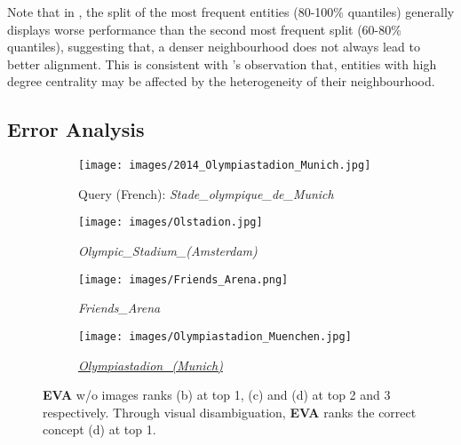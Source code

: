 \documentclass[letterpaper]{article} \usepackage{aaai21}  \usepackage{times}  \usepackage{helvet} \usepackage{courier}  \usepackage[hyphens]{url}  \usepackage{graphicx} \urlstyle{rm} \def\UrlFont{\rm}  \usepackage{natbib}  \usepackage{caption} \frenchspacing  \setlength{\pdfpagewidth}{8.5in}  \setlength{\pdfpageheight}{11in}
\newcommand{\modelname}[0]{\textbf{\textsc{EVA}}\xspace}
\begin{document}
Note that in , the split of the most frequent entities (80-100\% quantiles)
generally displays worse performance than the second most frequent split (60-80\% quantiles), suggesting that, 
a denser neighbourhood does not always lead to better alignment.
This is consistent with \citet{sun2020alinet}'s observation that, entities with high degree centrality may be affected by the heterogeneity of their neighbourhood.








\subsection{Error Analysis}
\label{sec:error_analysis}


\begin{figure}[t!]
  \centering
\begin{subfigure}[b]{\linewidth}
\centering
    \texttt{[image: images/2014\_Olympiastadion\_Munich.jpg]}
    \caption{Query (French): \emph{Stade\_olympique\_de\_Munich}}
  \end{subfigure}
  
\hspace{-0.5em}
  \begin{subfigure}[b]{0.37\linewidth}
  \centering
    \texttt{[image: images/Olstadion.jpg]}
    \caption{\tiny{\emph{Olympic\_Stadium\_(Amsterdam)}}}
  \end{subfigure}
\begin{subfigure}[b]{0.3\linewidth}
    \centering
    \texttt{[image: images/Friends\_Arena.png]}
    \caption{\tiny{\emph{Friends\_Arena}}}
  \end{subfigure}
\begin{subfigure}[b]{0.32\linewidth}
    \centering
    \texttt{[image: images/Olympiastadion\_Muenchen.jpg]}
    \caption{\underline{\tiny{\emph{Olympiastadion\_(Munich)}}}}
  \end{subfigure}
  \caption{\small{\modelname w/o images ranks (b) at top 1, (c) and (d) at top 2 and 3 respectively. Through visual disambiguation, \modelname ranks the correct concept (d) at top 1.}}
  \label{fig:stadium}
\end{figure}
\end{document}
